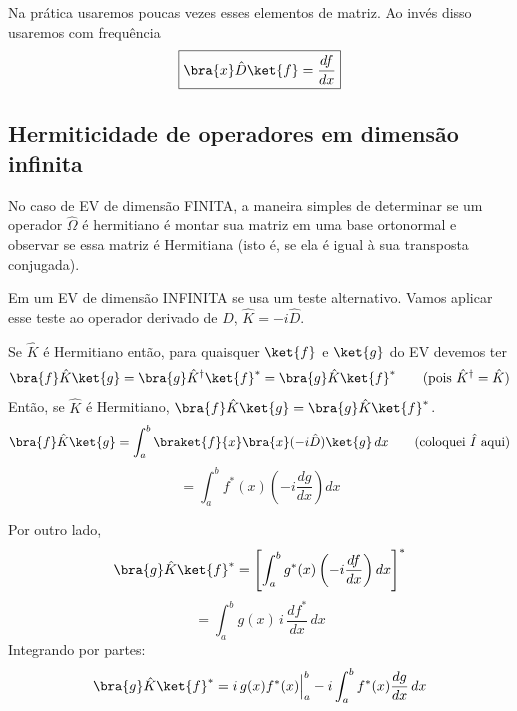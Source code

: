 Na prática usaremos poucas vezes esses elementos de matriz. Ao invés disso usaremos com frequência
\begin{equation}
\boxed{\bra{x}\hat{D}\ket{f} = \frac{df}{dx}}
\label{eq:aula7_D_pratico}
\end{equation}

\subsection*{Hermiticidade de operadores em dimensão infinita}

No caso de EV de dimensão FINITA, a maneira simples de determinar se um operador $\hat{\Omega}$ é hermitiano é montar sua matriz em uma base ortonormal e observar se essa matriz é Hermitiana (isto é, se ela é igual à sua transposta conjugada).

Em um EV de dimensão INFINITA se usa um teste alternativo. Vamos aplicar esse teste ao operador derivado de $\hat{D}$, $\hat{K} = -i\hat{D}$.

Se $\hat{K}$ é Hermitiano então, para quaisquer $\ket{f}$ e $\ket{g}$ do EV devemos ter
\begin{equation}
\bra{f}\hat{K}\ket{g} = \bra{g}\hat{K}^\dagger\ket{f}^* = \bra{g}\hat{K}\ket{f}^* \qquad (\text{pois } \hat{K}^\dagger = \hat{K})
\label{eq:aula7_K_hermitiano_def}
\end{equation}
Então, se $\hat{K}$ é Hermitiano, $\bra{f}\hat{K}\ket{g} = \bra{g}\hat{K}\ket{f}^*$.
\begin{equation}
\bra{f}\hat{K}\ket{g} = \int_a^b \braket{f}{x}\bra{x}(-i\hat{D})\ket{g}\,dx \qquad \text{(coloquei $\hat{I}$ aqui)}
\label{eq:aula7_K_passo1}
\end{equation}
\begin{equation}
= \int_a^b f^*(x)\left(-i\frac{dg}{dx}\right)dx
\label{eq:aula7_K_passo2}
\end{equation}

Por outro lado,
\begin{equation}
\bra{g}\hat{K}\ket{f}^* = \left[\int_a^b g^*(x)\left(-i\frac{df}{dx}\right)dx\right]^*
\label{eq:aula7_K_conj1}
\end{equation}
\begin{equation}
= \int_a^b g(x)\, i\,\frac{df^*}{dx}\,dx
\label{eq:aula7_K_conj2}
\end{equation}
Integrando por partes:
\begin{equation}
\bra{g}\hat{K}\ket{f}^* = i\, g(x) f^*(x)\Big|_a^b - i\int_a^b f^*(x)\frac{dg}{dx}\,dx
\label{eq:aula7_K_partes}
\end{equation}

